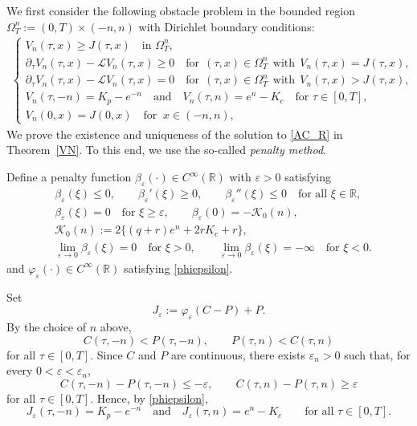 \documentclass[11pt, a4paper, leqno]{amsart}
\numberwithin{equation}{section}
\theoremstyle{plain}
\theoremstyle{definition}
\theoremstyle{remark}
\def\leq{\leqslant}
\def\geq{\geqslant}
\begin{document}
We first consider the following obstacle problem in the bounded region
$\Omega_T^n:=(0,T)\times(-n,n)$
{with Dirichlet boundary conditions:}
\begin{align}\label{AC_R}
    \begin{cases}
    {V_n(\tau,x)\geq J(\tau,x)\quad\text{in }\Omega_T^n,}\\
    \partial_\tau V_n(\tau,x)-\mathcal{L}V_n(\tau,x)\geq 0 \quad 
   \text{for}\ \ (\tau,x)\in\Omega_T^n \ \ 
   \text{with} \ \ V_n(\tau,x)=J(\tau,x),  
   \\
   \partial_\tau V_n(\tau,x)-\mathcal{L}V_n(\tau,x)= 0 \quad 
   \text{for}\ \ (\tau,x)\in\Omega_T^n \ \ 
   \text{with} \ \ V_n(\tau,x)>J(\tau,x), 
   \\
   {
   V_n(\tau,-n)=K_p-e^{-n}
   \quad \text{and} \quad
   V_n(\tau,n)=e^n-K_c
   \quad \text{for }\tau\in[0,T],
   }
   \\
    V_n(0,x)=J(0,x) \quad \text{for }\ x\in (-n,n),
\end{cases}
\end{align}
We prove the existence and uniqueness of the solution to \eqref{AC_R} in Theorem~\ref{VN}. To this end, we use the so-called \textit{penalty method}.

{
Define a penalty function $\beta_{\varepsilon}(\cdot)\in C^{\infty}(\mathbb{R})$
with $\varepsilon>0$ satisfying
\begin{equation}\label{beta}
\begin{aligned}
&\beta_\varepsilon(\xi)\leq0,\qquad
\beta_\varepsilon'(\xi)\geq0,\qquad
\beta_\varepsilon''(\xi)\leq0
\quad\text{for all }\xi\in\mathbb R,\\
&\beta_\varepsilon(\xi)=0
\quad\text{for }\xi\geq\varepsilon,\qquad
\beta_\varepsilon(0)=-\mathcal K_0{(n)},\\
&\mathcal K_0{(n)}
:=2\big\{(q+r)e^n+2rK_c+r\big\},\\
&\lim_{\varepsilon\to0}\beta_\varepsilon(\xi)=0
\quad\text{for }\xi>0,\qquad
\lim_{\varepsilon\to0}\beta_\varepsilon(\xi)=-\infty
\quad\text{for }\xi<0.
\end{aligned}
\end{equation}
and $\varphi_\varepsilon(\cdot)\in C^\infty(\mathbb{R})$
satisfying \eqref{phiepsilon}.
}

{
Set
\begin{equation}\label{Jepsilon}
    J_{\varepsilon}:=\varphi_\varepsilon(C-P)+P.
\end{equation}
By the choice of $n$ above,
\[
    C(\tau,-n)<P(\tau,-n),
    \qquad
    P(\tau,n)<C(\tau,n)
\]
for all $\tau\in[0,T]$. Since $C$ and $P$ are continuous, there exists
$\varepsilon_n>0$ such that, for every
$0<\varepsilon<\varepsilon_n$,
\[
    C(\tau,-n)-P(\tau,-n)\leq-\varepsilon,
    \qquad
    C(\tau,n)-P(\tau,n)\geq\varepsilon
\]
for all $\tau\in[0,T]$.
Hence, by \eqref{phiepsilon},
\[
    J_\varepsilon(\tau,-n)=K_p-e^{-n}
    \quad\text{and}\quad
    J_\varepsilon(\tau,n)=e^n-K_c
    \qquad\text{for all }\tau\in[0,T].
\]
}
\end{document}
